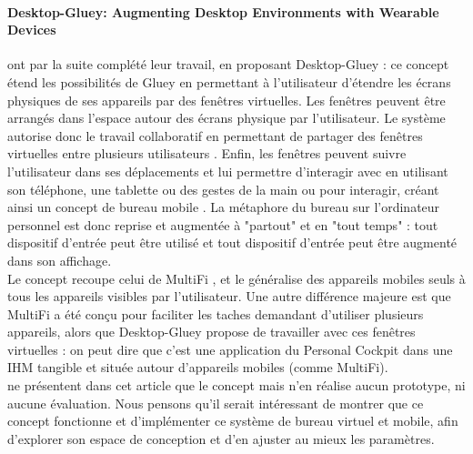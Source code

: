
\paragraph{\foreignlanguage{english}{Desktop-Gluey: Augmenting Desktop Environments with Wearable Devices}}
\citet{SerranoEnsYangEtAl2015b} ont par la suite complété leur travail, en proposant Desktop-Gluey : ce concept étend les possibilités de Gluey en permettant à l'utilisateur d'étendre les écrans physiques de ses appareils par des fenêtres virtuelles. Les fenêtres peuvent être arrangés dans l'espace autour des écrans physique par l'utilisateur. Le système autorise donc le travail collaboratif en permettant de partager des fenêtres virtuelles entre plusieurs utilisateurs . Enfin, les fenêtres peuvent suivre l'utilisateur dans ses déplacements et lui permettre d'interagir avec en utilisant son téléphone, une tablette ou des gestes de la main ou pour interagir, créant ainsi un concept de bureau mobile . La métaphore du bureau sur l'ordinateur personnel est donc reprise et augmentée à "partout" et en "tout temps" : tout dispositif d'entrée peut être utilisé et tout dispositif d'entrée peut être augmenté dans son affichage.\\
Le concept recoupe celui de MultiFi \citep{GrubertHeinischQuigleyEtAl2015}, et le généralise des appareils mobiles seuls à tous les appareils visibles par l'utilisateur. Une autre différence majeure est que MultiFi a été conçu pour faciliter les taches demandant d'utiliser plusieurs appareils, alors que Desktop-Gluey propose de travailler avec ces fenêtres virtuelles : on peut dire que c'est une application du Personal Cockpit \citep{EnsFinneganIrani2014} dans une IHM tangible et située autour d'appareils mobiles (comme MultiFi).\\
\citeauthor{SerranoEnsYangEtAl2015b} ne présentent dans cet article que le concept mais n'en réalise aucun prototype, ni aucune évaluation. Nous pensons qu'il serait intéressant de montrer que ce concept fonctionne et d'implémenter ce système de bureau virtuel et mobile, afin d'explorer son espace de conception et d'en ajuster au mieux les paramètres.


